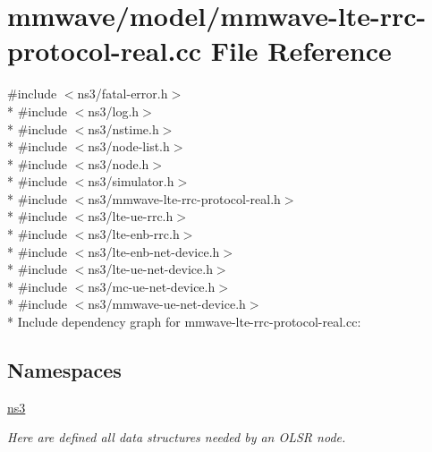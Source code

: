 \hypertarget{mmwave-lte-rrc-protocol-real_8cc}{}\section{mmwave/model/mmwave-\/lte-\/rrc-\/protocol-\/real.cc File Reference}
\label{mmwave-lte-rrc-protocol-real_8cc}
{\ttfamily \#include $<$ns3/fatal-\/error.\+h$>$}\\*
{\ttfamily \#include $<$ns3/log.\+h$>$}\\*
{\ttfamily \#include $<$ns3/nstime.\+h$>$}\\*
{\ttfamily \#include $<$ns3/node-\/list.\+h$>$}\\*
{\ttfamily \#include $<$ns3/node.\+h$>$}\\*
{\ttfamily \#include $<$ns3/simulator.\+h$>$}\\*
{\ttfamily \#include $<$ns3/mmwave-\/lte-\/rrc-\/protocol-\/real.\+h$>$}\\*
{\ttfamily \#include $<$ns3/lte-\/ue-\/rrc.\+h$>$}\\*
{\ttfamily \#include $<$ns3/lte-\/enb-\/rrc.\+h$>$}\\*
{\ttfamily \#include $<$ns3/lte-\/enb-\/net-\/device.\+h$>$}\\*
{\ttfamily \#include $<$ns3/lte-\/ue-\/net-\/device.\+h$>$}\\*
{\ttfamily \#include $<$ns3/mc-\/ue-\/net-\/device.\+h$>$}\\*
{\ttfamily \#include $<$ns3/mmwave-\/ue-\/net-\/device.\+h$>$}\\*
Include dependency graph for mmwave-\/lte-\/rrc-\/protocol-\/real.cc\+:
\subsection*{Namespaces}
\begin{DoxyCompactItemize}
\item 
 \hyperlink{namespacens3}{ns3}
\begin{DoxyCompactList}\small\item\em Here are defined all data structures needed by an O\+L\+SR node. \end{DoxyCompactList}\end{DoxyCompactItemize}
